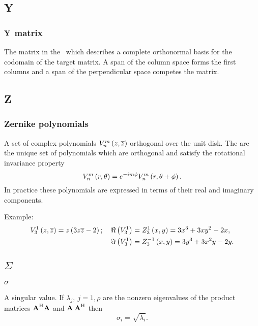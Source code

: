 \subsection*{Y} 

\subsubsection*{$\textbf{Y}^{\mathrm{}}$ matrix}
The matrix in the \svdl \ which describes a complete orthonormal basis for the codomain of the target matrix. A span of the column space forms the first columns and a span of the perpendicular space competes the matrix.

\subsection*{Z} 

\subsubsection*{Zernike polynomials}
A set of complex polynomials $V_n^m \left( z,\overline{z} \right)$ orthogonal over the unit disk. The are the unique set of polynomials which are orthogonal and satisfy the rotational invariance property $$V_n^m \left( r,\theta \right) = e^{ -i m \phi }V_n^m \left( r,\theta + \phi \right).$$
In practice these polynomials are expressed in terms of their real and imaginary components.

Example: \\
\begin{equation*}
  \begin{split}
V_3^1 \left( z,\overline{z} \right) = z\left( 3z\overline{z}-2 \right); \quad 
\Re\left( V_3^1 \right) &= Z_3^{1}\left( x,y \right) = 3x^3+3xy^2-2x, \\ 
\Im\left( V_3^1 \right) &= Z_3^{-1}\left( x,y \right) = 3y^3+3x^2y-2y. \\   
  \end{split}
\end{equation*}

\subsection*{$\Sigma$} 

\subsubsection*{$\sigma$}
A singular value. If $\lambda_j,\ j=1,\rho$ are the nonzero eigenvalues of the product matrices $\textbf{A}^{\mathrm{ \mathrm{H} }}\textbf{A}^{\mathrm{}}$ and $\textbf{A}^{\mathrm{}}\,\textbf{A}^{\mathrm{ \mathrm{H} }}$ then
\begin{equation}
  \sigma_i = \sqrt{\lambda_i}.
\end{equation}


